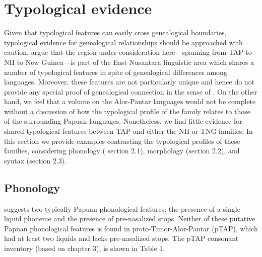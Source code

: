 \section{Typological evidence}
Given that typological features can easily cross genealogical boundaries, typological evidence for genealogical relationships should be approached with caution. \citet{KlamerEtAl2008} argue that the region under consideration here---spanning from TAP to NH to New Guinea---is part of the East Nusantara linguistic area which shares a number of typological features in spite of genealogical differences among languages. Moreover, these features are not particularly unique and hence do not provide any special proof of genealogical connection in the sense of \citet{Meillet1967}. On the other hand, we feel that a volume on the Alor-Pantar languages would not be complete without a discussion of how the typological profile of the family relates to those of the surrounding Papuan languages. Nonetheless, we find little evidence for shared typological features between TAP and either the NH or TNG families. In this section we provide examples contrasting the typological profiles of these families, considering phonology (
section 2.1), morphology (section 2.2), and syntax (section 2.3).

\subsection{Phonology}
\citet{Foley1998} suggests two typically Papuan phonological features: the presence of a single liquid phoneme and the presence of pre-nasalized stops. Neither of these putative Papuan phonological features is found in proto-Timor-Alor-Pantar (pTAP), which had at least two liquids and lacks pre-nasalized stops. The pTAP consonant inventory (based on chapter 3), is shown in Table 1.


